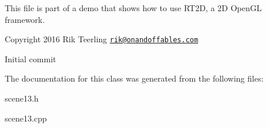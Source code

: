 This file is part of a demo that shows how to use R\+T2D, a 2D Open\+GL framework.


\begin{DoxyItemize}
\item Copyright 2016 Rik Teerling \href{mailto:rik@onandoffables.com}{\tt rik@onandoffables.\+com}
\begin{DoxyItemize}
\item Initial commit 
\end{DoxyItemize}
\end{DoxyItemize}

The documentation for this class was generated from the following files\+:\begin{DoxyCompactItemize}
\item 
scene13.\+h\item 
scene13.\+cpp\end{DoxyCompactItemize}
